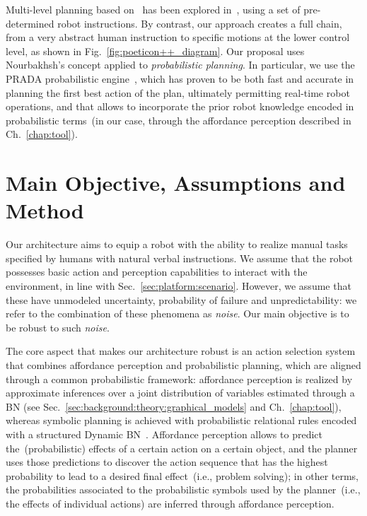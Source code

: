 Multi-level planning based on~\cite{nourbakhsh:1998:wac} has been explored in~\cite{wolfe:2010:icaps,kaelbling:2011:icra,lozano:2014:iros}, using a set of pre-determined robot instructions.
By contrast, our approach creates a full chain, from a very abstract human instruction to specific motions at the lower control level, as shown in Fig.~\ref{fig:poeticon++_diagram}.
Our proposal uses Nourbakhsh's concept applied to \emph{probabilistic planning}.
In particular, we use the PRADA probabilistic engine~\cite{lang:2010:prada}, which has proven to be both fast and accurate in planning the first best action of the plan, ultimately permitting real-time robot operations, and that allows to incorporate the prior robot knowledge encoded in probabilistic terms~(in our case, through the affordance perception described in Ch.~\ref{chap:tool}).

\section{Main Objective, Assumptions and Method}
\label{sec:poeticon++:setup}

Our architecture aims to equip a robot with the ability to realize manual tasks specified by humans with natural verbal instructions.
We assume that the robot possesses basic action and perception capabilities to interact with the environment, in line with Sec.~\ref{sec:platform:scenario}. However, we assume that these have unmodeled uncertainty, probability of failure and unpredictability: we refer to the combination of these phenomena as \emph{noise}.
Our main objective is to be robust to such \emph{noise}.

The core aspect that makes our architecture robust is an action selection system that combines affordance perception and probabilistic planning, which are aligned through a common probabilistic framework:
affordance perception is realized by approximate inferences over a joint distribution of variables estimated through a \acl{BN} (see Sec.~\ref{sec:background:theory:graphical_models} and Ch.~\ref{chap:tool}), whereas symbolic planning is achieved with probabilistic relational rules encoded with a structured Dynamic \acl{BN}~\cite{lang:2010:prada}.
Affordance perception allows to predict the~(probabilistic) effects of a certain action on a certain object, and the planner uses those predictions to discover the action sequence that has the highest probability to lead to a desired final effect~(i.e., problem solving); in other terms, the probabilities associated to the probabilistic symbols used by the planner~(i.e., the effects of individual actions) are inferred through affordance perception.

